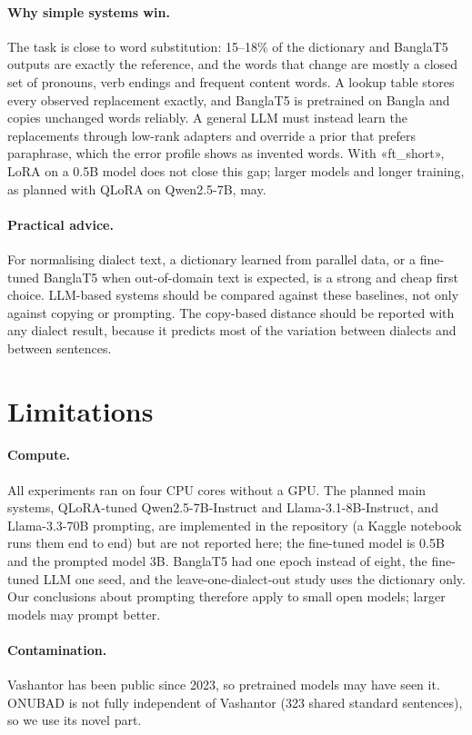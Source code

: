 \documentclass[10pt,twocolumn]{article}
\begin{document}
\paragraph{Why simple systems win.} The task is close to word substitution: 15--18\% of the dictionary and
BanglaT5 outputs are exactly the reference, and the words that change are mostly a closed set of pronouns,
verb endings and frequent content words. A lookup table stores every observed replacement exactly, and
BanglaT5 is pretrained on Bangla and copies unchanged words reliably. A general LLM must instead learn the
replacements through low-rank adapters and override a prior that prefers paraphrase, which the error profile
shows as invented words. With «ft_short», LoRA on a 0.5B model does not close this gap; larger models and
longer training, as planned with QLoRA on Qwen2.5-7B, may.

\paragraph{Practical advice.} For normalising dialect text, a dictionary learned from parallel data, or a
fine-tuned BanglaT5 when out-of-domain text is expected, is a strong and cheap first choice. LLM-based systems
should be compared against these baselines, not only against copying or prompting. The copy-based distance
should be reported with any dialect result, because it predicts most of the variation between dialects and
between sentences.

\section{Limitations}
\paragraph{Compute.} All experiments ran on four CPU cores without a GPU. The planned main systems,
QLoRA-tuned Qwen2.5-7B-Instruct and Llama-3.1-8B-Instruct, and Llama-3.3-70B prompting, are implemented in the
repository (a Kaggle notebook runs them end to end) but are not reported here; the fine-tuned model is 0.5B and
the prompted model 3B. BanglaT5 had one epoch instead of eight, the fine-tuned LLM one seed, and the
leave-one-dialect-out study uses the dictionary only. Our conclusions about prompting therefore apply to
small open models; larger models may prompt better.

\paragraph{Contamination.} Vashantor has been public since 2023, so pretrained models may have seen it.
ONUBAD is not fully independent of Vashantor (323 shared standard sentences), so we use its novel part.
\end{document}
